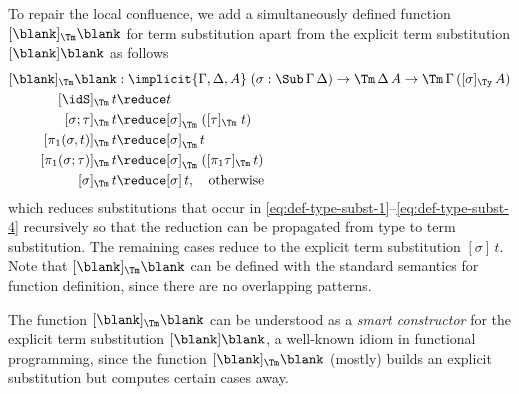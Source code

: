\documentclass[a4paper,UKenglish,numberwithinsect,cleveref,thm-restate]{lipics-v2021}
\begin{document}
To repair the local confluence, we add a simultaneously defined function $[\blank]_{\Tm}\blank$ for term substitution apart from the explicit term substitution $[\blank]\blank$ as follows
\begin{alignat*}{3}
  [\blank]_{\Tm}\blank & : \implicit{\Gamma, \Delta, A}\;(\sigma : \Sub\,\Gamma\,\Delta) \to \Tm\,\Delta\,A \to \Tm\,\Gamma\,([\sigma]_{\Ty}\,A) \\
[ \idS ]_{\Tm}\,t          & \reduce t \\
[ \sigma ; \tau ]_{\Tm}\,t & \reduce [ \sigma ]_{\Tm}\;([ \tau ]_{\Tm}\;t) \\
[ \pi_1(\sigma, t) ]_{\Tm}\,t & \reduce [\sigma]_\Tm\,t \\
[ \pi_1(\sigma; \tau) ]_{\Tm}\,t & \reduce [\sigma]_\Tm\; ([\pi_1\tau]_\Tm \,t) \\
[ \sigma ]_{\Tm}\,t        & \reduce [ \sigma ]\,t, \quad \text{otherwise}
\end{alignat*}
which reduces substitutions that occur in \eqref{eq:def-type-subst-1}--\eqref{eq:def-type-subst-4} recursively so that the reduction can be propagated from type to term substitution.
The remaining cases reduce to the explicit term substitution $[\sigma]\,t$.
Note that $[\blank]_{\Tm}\blank$ can be defined with the standard semantics for function definition, since there are no overlapping patterns.
\begin{remark}
  The function $[\blank]_{\Tm}\blank$ can be understood as a \emph{smart constructor} for the explicit term substitution $[\blank]\blank$, a well-known idiom in functional programming, since the function $[\blank]_{\Tm}\blank$ (mostly) builds an explicit substitution but computes certain cases away.
\end{remark}
\end{document}
